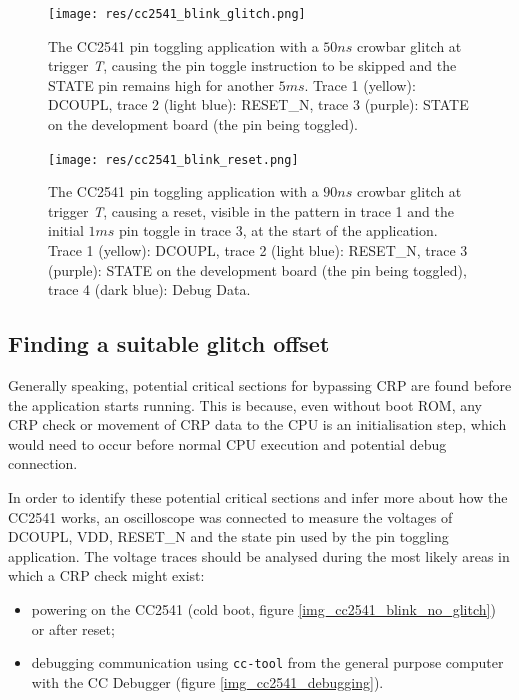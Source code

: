 \begin{figure}
\centering
\texttt{[image: res/cc2541\_blink\_glitch.png]}
\caption{The CC2541 pin toggling application with a \(50ns\) crowbar
glitch at trigger \emph{T}, causing the pin toggle instruction to be
skipped and the STATE pin remains high for another \(5ms\). Trace 1
(yellow): DCOUPL, trace 2 (light blue): RESET\_N, trace 3 (purple):
STATE on the development board (the pin being toggled).
\label{img_cc2541_blink_glitch}}
\end{figure}

\begin{figure}
\centering
\texttt{[image: res/cc2541\_blink\_reset.png]}
\caption{The CC2541 pin toggling application with a \(90ns\) crowbar
glitch at trigger \emph{T}, causing a reset, visible in the pattern in
trace 1 and the initial \(1ms\) pin toggle in trace 3, at the start of
the application. Trace 1 (yellow): DCOUPL, trace 2 (light blue):
RESET\_N, trace 3 (purple): STATE on the development board (the pin
being toggled), trace 4 (dark blue): Debug Data.
\label{img_cc2541_blink_reset}}
\end{figure}

\hypertarget{finding-a-suitable-glitch-offset-1}{%
\subsection{\texorpdfstring{Finding a suitable glitch
offset\label{section_cc2541_suitable_offset}}{Finding a suitable glitch offset}}\label{finding-a-suitable-glitch-offset-1}}

Generally speaking, potential critical sections for bypassing CRP are
found before the application starts running. This is because, even
without boot ROM, any CRP check or movement of CRP data to the CPU is an
initialisation step, which would need to occur before normal CPU
execution and potential debug connection.

In order to identify these potential critical sections and infer more
about how the CC2541 works, an oscilloscope was connected to measure the
voltages of DCOUPL, VDD, RESET\_N and the state pin used by the pin
toggling application. The voltage traces should be analysed during the
most likely areas in which a CRP check might exist:

\begin{itemize}
\tightlist
\item
  powering on the CC2541 (cold boot, figure
  \ref{img_cc2541_blink_no_glitch}) or after reset;
\item
  debugging communication using \texttt{cc-tool} from the general
  purpose computer with the CC Debugger (figure
  \ref{img_cc2541_debugging}).
\end{itemize}

